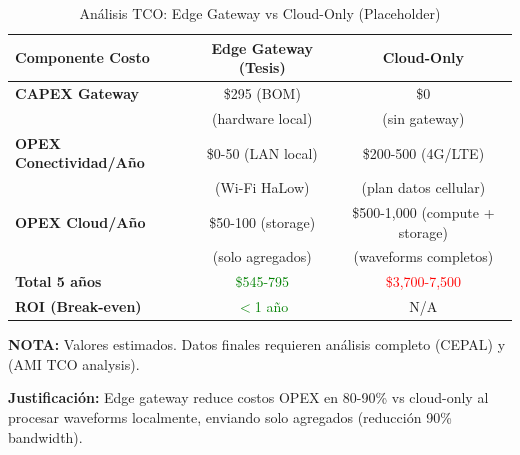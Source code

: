 \begin{table}[htbp]
\centering
\caption{Análisis TCO: Edge Gateway vs Cloud-Only (Placeholder)}
\label{tab:tco_edge_gateway_vs_cloud}
\begin{tabular}{|l|c|c|}
\hline
\textbf{Componente Costo} & \textbf{Edge Gateway (Tesis)} & \textbf{Cloud-Only} \\
\hline
\hline
\textbf{CAPEX Gateway} & \$295 (BOM) & \$0 \\
& (hardware local) & (sin gateway) \\
\hline
\textbf{OPEX Conectividad/Año} & \$0-50 (LAN local) & \$200-500 (4G/LTE) \\
& (Wi-Fi HaLow) & (plan datos cellular) \\
\hline
\textbf{OPEX Cloud/Año} & \$50-100 (storage) & \$500-1,000 (compute + storage) \\
& (solo agregados) & (waveforms completos) \\
\hline
\textbf{Total 5 años} & \textcolor{green}{\$545-795} & \textcolor{red}{\$3,700-7,500} \\
\hline
\textbf{ROI (Break-even)} & \textcolor{green}{$<$1 año} & N/A \\
\hline
\end{tabular}
\medskip

\small
\textbf{NOTA:} Valores estimados. Datos finales requieren análisis completo 
\cite{denigrisSmartGridsLatin2016} (CEPAL) y \cite{mchenryTechnicalGovernance2013} 
(AMI TCO analysis).

\medskip
\textbf{Justificación:} Edge gateway reduce costos OPEX en 80-90\% vs cloud-only 
al procesar waveforms localmente, enviando solo agregados (reducción 90\% bandwidth).
\end{table}



